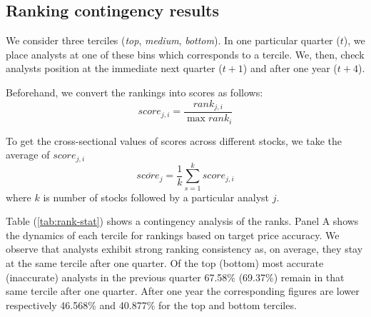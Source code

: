 \documentclass{article}\usepackage[]{graphicx}\usepackage[]{color}
\begin{document}
\subsection{Ranking contingency results}
We consider  three terciles (\textit{top}, \textit{medium}, \textit{bottom}). In one particular quarter ($t$), we place  analysts at one of these bins which corresponds to a tercile. We, then,  check analysts position at the immediate next quarter ($t+1$) and after one year ($t+4$).   

Beforehand, we convert the rankings into scores as follows:
\begin{equation}
\label{eq:score}
score_{j,i}=\frac{rank_{j,i}}{\max{rank_i}}
\end{equation}

To get the cross-sectional values of scores across different stocks, we take the average of $score_{j,i}$
\begin{equation}
\label{eq:mean-score}
\overline{score_{j}}= \frac{1}{k} \sum_{s=1}^{k} score_{j,i}
\end{equation}
where $k$ is number of stocks followed by a particular analyst $j$. 

Table (\ref{tab:rank-stat}) shows a contingency analysis of the ranks. 
Panel A shows the dynamics of each tercile for rankings based on target price  accuracy. We observe that analysts exhibit strong ranking consistency as, on average, they stay at the same tercile after one quarter. Of the top (bottom) most accurate (inaccurate) analysts in the previous quarter 67.58\% (69.37\%) remain in that same tercile after one quarter. After one year the corresponding figures are lower respectively 46.568\% and 40.877\% for the top and bottom terciles. 
\end{document}
